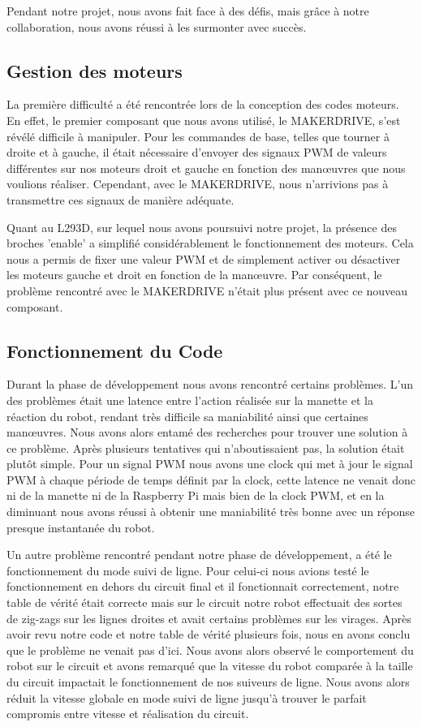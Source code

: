 Pendant notre projet, nous avons fait face à des défis, mais grâce à notre collaboration, nous avons réussi à les surmonter avec succès.

\subsection{Gestion des moteurs}
La première difficulté a été rencontrée lors de la conception des codes moteurs. En effet, le premier composant que nous avons utilisé, le MAKERDRIVE, s'est révélé difficile à manipuler. Pour les commandes de base, telles que tourner à droite et à gauche, il était nécessaire d'envoyer des signaux PWM de valeurs différentes sur nos moteurs droit et gauche en fonction des manœuvres que nous voulions réaliser. Cependant, avec le MAKERDRIVE, nous n'arrivions pas à transmettre ces signaux de manière adéquate.

Quant au L293D, sur lequel nous avons poursuivi notre projet, la présence des broches 'enable' a simplifié considérablement le fonctionnement des moteurs. Cela nous a permis de fixer une valeur PWM et de simplement activer ou désactiver les moteurs gauche et droit en fonction de la manœuvre. Par conséquent, le problème rencontré avec le MAKERDRIVE n'était plus présent avec ce nouveau composant.

\subsection{Fonctionnement du Code}
Durant la phase de développement nous avons rencontré certains problèmes. L'un des problèmes était une latence entre l'action réalisée sur la manette et la réaction du robot, rendant très difficile sa maniabilité ainsi que certaines manœuvres. Nous avons alors entamé des recherches pour trouver une solution à ce problème. Après plusieurs tentatives qui n'aboutissaient pas, la solution était plutôt simple. Pour un signal PWM nous avons une clock qui met à jour le signal PWM à chaque période de temps définit par la clock, cette latence ne venait donc ni de la manette ni de la Raspberry Pi mais bien de la clock PWM, et en la diminuant nous avons réussi à obtenir une maniabilité très bonne avec un réponse presque instantanée du robot.

Un autre problème rencontré pendant notre phase de développement, a été le fonctionnement du mode suivi de ligne. Pour celui-ci nous avions testé le fonctionnement en dehors du circuit final et il fonctionnait correctement, notre table de vérité était correcte mais sur le circuit notre robot effectuait des sortes de zig-zags sur les lignes droites et avait certains problèmes sur les virages. Après avoir revu notre code et notre table de vérité plusieurs fois, nous en avons conclu que le problème ne venait pas d'ici. Nous avons alors observé le comportement du robot sur le circuit et avons remarqué que la vitesse du robot comparée à la taille du circuit impactait le fonctionnement de nos suiveurs de ligne. Nous avons alors réduit la vitesse globale en mode suivi de ligne jusqu'à trouver le parfait compromis entre vitesse et réalisation du circuit.

